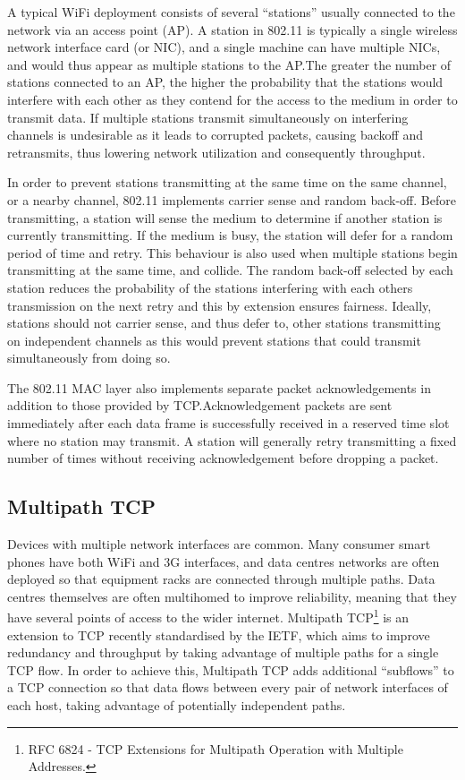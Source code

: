 A typical WiFi deployment consists of several ``stations'' usually connected to
the network via an access point (AP). A station in 802.11 is typically a single
wireless network interface card (or NIC), and a single machine can have multiple
NICs, and would thus appear as multiple stations to the AP.\@ The greater the
number of stations connected to an AP, the higher the probability that the
stations would interfere with each other as they contend for the access to the
medium in order to transmit data. If multiple stations transmit simultaneously
on interfering channels is undesirable as it leads to corrupted packets, causing
backoff and retransmits, thus lowering network utilization and consequently
throughput.

In order to prevent stations transmitting at the same time on the same channel,
or a nearby channel, 802.11 implements carrier sense and random back-off. Before
transmitting, a station will sense the medium to determine if another station is
currently transmitting. If the medium is busy, the station will defer for a
random period of time and retry. This behaviour is also used when multiple
stations begin transmitting at the same time, and collide. The random back-off
selected by each station reduces the probability of the stations interfering
with each others transmission on the next retry and this by extension ensures
fairness. Ideally, stations should not carrier sense, and thus defer to, other
stations transmitting on independent channels as this would prevent stations
that could transmit simultaneously from doing so.

The 802.11 MAC layer also implements separate packet acknowledgements in addition
to those provided by TCP.\@ Acknowledgement packets are sent immediately after
each data frame is successfully received in a reserved time slot where no station
may transmit. A station will generally retry transmitting a fixed number of times
without receiving acknowledgement before dropping a packet.

\subsection{Multipath TCP}
\label{sec:bg:mptcp}
Devices with multiple network interfaces are common. Many consumer smart phones
have both WiFi and 3G interfaces, and data centres networks are often deployed
so that equipment racks are connected through multiple paths. Data centres
themselves are often multihomed to improve reliability, meaning that they have
several points of access to the wider internet. Multipath TCP\footnote{RFC 6824
 - TCP Extensions for Multipath Operation with Multiple Addresses.} is an
extension to TCP recently standardised by the IETF, which aims to improve
redundancy and throughput by taking advantage of multiple paths for a single
TCP flow. In order to achieve this, Multipath TCP adds additional ``subflows''
to a TCP connection so that data flows between every pair of network
interfaces of each host, taking advantage of potentially independent paths.

